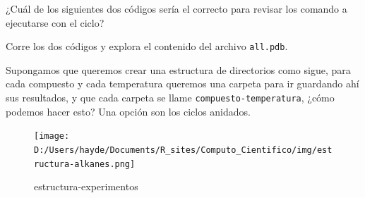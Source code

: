 \documentclass[
]{book}
\newenvironment{Shaded}{\begin{snugshade}}{\end{snugshade}}
\newcommand{\CommentTok}[1]{\textcolor[rgb]{0.56,0.35,0.01}{\textit{#1}}}
\newcommand{\ExtensionTok}[1]{#1}
\newcommand{\FunctionTok}[1]{\textcolor[rgb]{0.13,0.29,0.53}{\textbf{#1}}}
\newcommand{\NormalTok}[1]{#1}
\newcommand{\OperatorTok}[1]{\textcolor[rgb]{0.81,0.36,0.00}{\textbf{#1}}}
\newcommand{\PreprocessorTok}[1]{\textcolor[rgb]{0.56,0.35,0.01}{\textit{#1}}}
\newcommand{\StringTok}[1]{\textcolor[rgb]{0.31,0.60,0.02}{#1}}
\newcommand{\VariableTok}[1]{\textcolor[rgb]{0.00,0.00,0.00}{#1}}
\begin{document}
\begin{Shaded}
\end{Shaded}

¿Cuál de los siguientes dos códigos sería el correcto para revisar los comando a ejecutarse con el ciclo?

\begin{Shaded}
\end{Shaded}

\begin{Shaded}
\end{Shaded}

Corre los dos códigos y explora el contenido del archivo \texttt{all.pdb}.

Supongamos que queremos crear una estructura de directorios como sigue, para cada compuesto y cada temperatura queremos una carpeta para ir guardando ahí sus resultados, y que cada carpeta se llame \texttt{compuesto-temperatura}, ¿cómo podemos hacer esto? Una opción son los ciclos anidados.

\begin{figure}
\centering
\texttt{[image: D:/Users/hayde/Documents/R\_sites/Computo\_Cientifico/img/estructura-alkanes.png]}
\caption{estructura-experimentos}
\end{figure}
\end{document}
